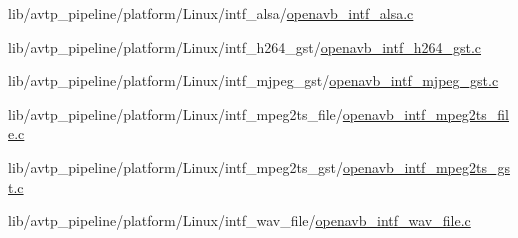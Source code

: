 \begin{DoxyCompactItemize}
lib/avtp\+\_\+pipeline/platform/\+Linux/intf\+\_\+alsa/\hyperlink{openavb__intf__alsa_8c}{openavb\+\_\+intf\+\_\+alsa.\+c}\item 
lib/avtp\+\_\+pipeline/platform/\+Linux/intf\+\_\+h264\+\_\+gst/\hyperlink{openavb__intf__h264__gst_8c}{openavb\+\_\+intf\+\_\+h264\+\_\+gst.\+c}\item 
lib/avtp\+\_\+pipeline/platform/\+Linux/intf\+\_\+mjpeg\+\_\+gst/\hyperlink{openavb__intf__mjpeg__gst_8c}{openavb\+\_\+intf\+\_\+mjpeg\+\_\+gst.\+c}\item 
lib/avtp\+\_\+pipeline/platform/\+Linux/intf\+\_\+mpeg2ts\+\_\+file/\hyperlink{openavb__intf__mpeg2ts__file_8c}{openavb\+\_\+intf\+\_\+mpeg2ts\+\_\+file.\+c}\item 
lib/avtp\+\_\+pipeline/platform/\+Linux/intf\+\_\+mpeg2ts\+\_\+gst/\hyperlink{openavb__intf__mpeg2ts__gst_8c}{openavb\+\_\+intf\+\_\+mpeg2ts\+\_\+gst.\+c}\item 
lib/avtp\+\_\+pipeline/platform/\+Linux/intf\+\_\+wav\+\_\+file/\hyperlink{openavb__intf__wav__file_8c}{openavb\+\_\+intf\+\_\+wav\+\_\+file.\+c}\end{DoxyCompactItemize}
